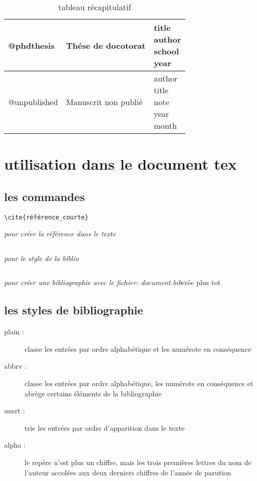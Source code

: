 \begin{table}
\begin{tabular}{|l|l|l|}
@phdthesis& Thése de docotorat&
\myminipage{ \vspace{0.5cm}
title\\
author\\
school\\
year \vspace{0.5cm}\\} \\\hline

@unpublished & Manuscrit non publié&
\myminipage{ \vspace{0.5cm}
author\\
title\\
note\\
year\\
month \vspace{0.5cm}\\}  \\\hline

\end{tabular}
	\caption{tableau récapitulatif}
	\label{tab:tableauRécapitulatif}
\end{table}

\chapter{utilisation dans le document tex}

\section{les commandes}

\begin{verbatim}\cite{référence_courte}\end{verbatim}
 \textit{pour créer la référence dans le texte}
\begin{verbatim}\end{verbatim} \textit{pour le style de la biblio}
 \begin{verbatim}\end{verbatim} \textit{pour créer une bibliographie avec le fichier:  document.bib}{\small crée plus tot}


\section{les styles de bibliographie}

\begin{description}
\item[plain : ] classe les entrées par ordre alphabétique et les numérote en conséquence
\item[abbrv : ] classe les entrées par ordre alphabétique, les numérote en conséquence et abrège certains éléments de la bibliographie
\item[unsrt : ] trie les entrées par ordre d'apparition dans le texte 
\item[alpha : ] le repère n'est plus un chiffre, mais les trois premières lettres du nom de l'auteur accolées aux deux derniers chiffres de l'année de parution
\end{description}
